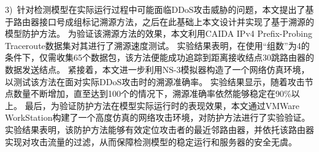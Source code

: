 \begin{cabstract}
3)~针对检测模型在实际运行过程中可能面临DDoS攻击威胁的问题，本文提出了基于路由器接口号成组标记溯源方法，之后在此基础上本文设计并实现了基于溯源的模型防护方法。
为验证该溯源方法的效果，本文利用CAIDA IPv4 Prefix-Probing Traceroute数据集对其进行了溯源速度测试。
实验结果表明，在使用“组数”为4的条件下，仅需收集65个数据包，该方法便能成功追踪到距离接收结点30跳路由器的数据发送结点。
紧接着，本文进一步利用NS-3模拟器构造了一个网络仿真环境，以测试该方法在面对实际DDoS攻击时的溯源准确率。
实验结果显示，随着攻击节点数量不断增加，直至达到100个的情况下，溯源准确率依然能够稳定在90\%以上。
最后，为验证防护方法在模型实际运行时的表现效果，本文通过VMWare WorkStation构建了一个高度仿真的网络攻击环境，对防护方法进行了实验验证。
实验结果表明，该防护方法能够有效定位攻击者的最近邻路由器，并依托该路由器实现对攻击流量的过滤，从而保障检测模型的稳定运行和服务器的安全无虞。
\end{cabstract}


